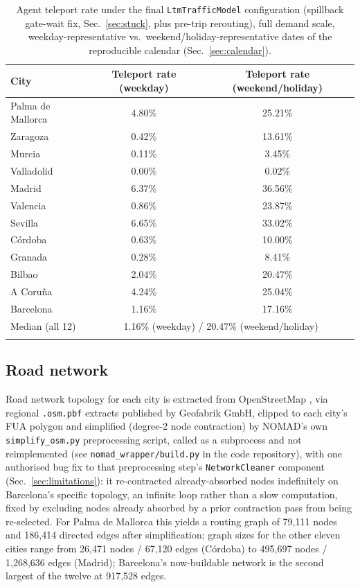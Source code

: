 \documentclass[pdflatex,sn-mathphys-ay]{sn-jnl}
\begin{document}
\begin{table}[h]
\caption{Agent teleport rate under the final \texttt{LtmTrafficModel}
configuration (spillback gate-wait fix, Sec.~\ref{sec:stuck}, plus
pre-trip rerouting), full demand scale, weekday-representative vs.\
weekend/holiday-representative dates of the reproducible calendar
(Sec.~\ref{sec:calendar}).}
\label{tab:teleport_ltm}
\begin{tabular}{@{}lcc@{}}
\toprule
City & Teleport rate (weekday) & Teleport rate (weekend/holiday) \\
\midrule
Palma de Mallorca & 4.80\% & 25.21\% \\
Zaragoza          & 0.42\% & 13.61\% \\
Murcia            & 0.11\% & 3.45\% \\
Valladolid        & 0.00\% & 0.02\% \\
Madrid            & 6.37\% & 36.56\% \\
Valencia          & 0.86\% & 23.87\% \\
Sevilla           & 6.65\% & 33.02\% \\
C\'ordoba         & 0.63\% & 10.00\% \\
Granada           & 0.28\% & 8.41\% \\
Bilbao            & 2.04\% & 20.47\% \\
A Coru\~na        & 4.24\% & 25.04\% \\
Barcelona         & 1.16\% & 17.16\% \\
\midrule
Median (all 12)   & \multicolumn{2}{c}{1.16\% (weekday) / 20.47\% (weekend/holiday)} \\
\botrule
\end{tabular}
\end{table}

\subsection{Road network}
\label{sec:network}

Road network topology for each city is extracted from OpenStreetMap
\cite{openstreetmap}, via regional \texttt{.osm.pbf} extracts published by
Geofabrik GmbH, clipped to each city's FUA polygon and simplified (degree-2
node contraction) by NOMAD's own \texttt{simplify\_osm.py} preprocessing
script, called as a subprocess and not reimplemented (see
\texttt{nomad\_wrapper/build.py} in the code repository), with one
authorised bug fix to that preprocessing step's \texttt{NetworkCleaner}
component (Sec.~\ref{sec:limitations}): it re-contracted already-absorbed
nodes indefinitely on Barcelona's specific topology, an infinite loop rather
than a slow computation, fixed by excluding nodes already absorbed by a
prior contraction pass from being re-selected. For Palma de Mallorca this
yields a routing graph of 79{,}111 nodes and 186{,}414 directed edges after
simplification; graph sizes for the other eleven cities range from
26{,}471 nodes / 67{,}120 edges (C\'ordoba) to 495{,}697 nodes /
1{,}268{,}636 edges (Madrid); Barcelona's now-buildable network is the
second largest of the twelve at 917{,}528 edges.
\end{document}
